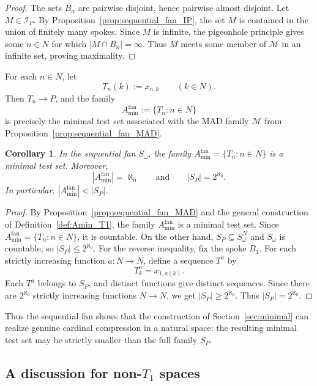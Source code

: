 \documentclass[11pt]{amsart}
\theoremstyle{plain}
\newtheorem{corollary}[theorem]{Corollary}
\theoremstyle{definition}
\theoremstyle{remark}
\newcommand{\Sp}{\mathcal{S}_P}
\newcommand{\N}{\mathbb{N}}
\def\Sp{S_P}%
\def\N{N}%
\begin{document}
\begin{proof}
The sets $B_n$ are pairwise disjoint, hence pairwise almost disjoint. Let $M\in\mathcal I_P$. By Proposition~\ref{prop:sequential_fan_IP}, the set $M$ is contained in the union of finitely many spokes. Since $M$ is infinite, the pigeonhole principle gives some $n\in\N$ for which $|M\cap B_n|=\infty$. Thus $M$ meets some member of $\mathcal M$ in an infinite set, proving maximality.
\end{proof}

For each $n\in\N$, let
\[
T_n(k):=x_{n,k}
\qquad (k\in\N).
\]
Then $T_n\to P$, and the family
\[
A_{\min}^{\mathrm{fan}}:=\{T_n:n\in\N\}
\]
is precisely the minimal test set associated with the MAD family $\mathcal M$ from Proposition~\ref{prop:sequential_fan_MAD}.

\begin{corollary}\label{cor:sequential_fan_minimal}
In the sequential fan $S_\omega$, the family $A_{\min}^{\mathrm{fan}}=\{T_n:n\in\N\}$ is a minimal test set.
Moreover,
\[
|A_{\min}^{\mathrm{fan}}|=\aleph_0
\qquad\text{and}\qquad
|\Sp|=2^{\aleph_0}.
\]
In particular, $|A_{\min}^{\mathrm{fan}}|<|\Sp|$.
\end{corollary}

\begin{proof}
By Proposition~\ref{prop:sequential_fan_MAD} and the general construction of Definition~\ref{def:Amin_T1}, the family $A_{\min}^{\mathrm{fan}}$ is a minimal test set.
Since $A_{\min}^{\mathrm{fan}}=\{T_n:n\in\N\}$, it is countable.
On the other hand, $\Sp\subseteq S_\omega^\N$ and $S_\omega$ is countable, so $|\Sp|\le 2^{\aleph_0}$.
For the reverse inequality, fix the spoke $B_1$.
For each strictly increasing function $a:\N\to\N$, define a sequence $T^a$ by
\[
T^a_k=x_{1,a(k)}.
\]
Each $T^a$ belongs to $\Sp$, and distinct functions give distinct sequences.
Since there are $2^{\aleph_0}$ strictly increasing functions $\N\to\N$, we get $|\Sp|\ge 2^{\aleph_0}$.
Thus $|\Sp|=2^{\aleph_0}$.
\end{proof}

Thus the sequential fan shows that the construction of Section~\ref{sec:minimal} can realize genuine cardinal compression in a natural space:
the resulting minimal test set may be strictly smaller than the full family $\Sp$.

\subsection{A discussion for non-\texorpdfstring{$T_1$}{T1} spaces}\label{subsec:nonT1_spaces}
\end{document}
